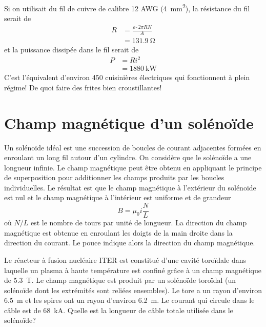 \begin{reponsebox}
  Si on utilisait du fil de cuivre de calibre 12 AWG
  (\SI{4}{\milli\meter\squared}), la résistance du fil serait de
  \begin{align*}
    R &= \frac{\rho \cdot 2 \pi R N}{A}  \\
      &= \SI{131.9}{\ohm}
  \end{align*}
  et la puissance dissipée dans le fil serait de
  \begin{align*}
    P &= Ri^2  \\
      &= \SI{1880}{\kilo\watt}
  \end{align*}
  C'est l'équivalent d'environ 450 cuisinières électriques qui fonctionnent à
  plein régime! De quoi faire des frites bien croustillantes!
\end{reponsebox}


\section{Champ magnétique d'un solénoïde}


Un solénoïde idéal est une succession de boucles de courant adjacentes formées
en enroulant un long fil autour d'un cylindre. On considère que le solénoïde a
une longueur infinie. Le champ magnétique peut être obtenu en appliquant le
principe de superposition pour additionner les champs produits par les boucles
individuelles. Le résultat est que le champ magnétique à l'extérieur du
solénoïde est nul et le champ magnétique à l'intérieur est uniforme et de
grandeur
$$B = \mu_0 i \frac{N}{L}$$
où $N/L$ est le nombre de tours par unité de longueur. La direction du champ
magnétique est obtenue en enroulant les doigts de la main droite dans la
direction du courant. Le pouce indique alors la direction du champ magnétique.


\begin{diapobox}
  Le réacteur à fusion nucléaire ITER est constitué d'une cavité toroïdale dans
  laquelle un plasma à haute température est confiné grâce à un champ
  magnétique de \SI{5.3}{\tesla}. Le champ magnétique est produit par un
  solénoïde toroïdal (un solénoïde dont les extrémités sont reliées ensembles).
  Le tore a un rayon d'environ \SI{6.5}{\meter} et les spires ont un rayon
  d'environ \SI{6.2}{\meter}. Le courant qui circule dans le câble est de
  \SI{68}{\kilo\ampere}. Quelle est la longueur de câble totale utilisée dans
  le solénoïde?
\end{diapobox}


